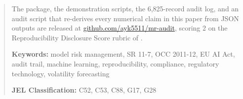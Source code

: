 \documentclass[12pt,a4paper]{article}
\begin{document}
\begin{abstract}
The package, the demonstration scripts, the 6{,}825-record audit log, and an audit script that re-derives every numerical claim in this paper from JSON outputs are released at \href{https://github.com/ayk5511/mr-audit}{github.com/ayk5511/mr-audit}, scoring 2 on the Reproducibility Disclosure Score rubric of \citet{Khan2026Survey}.

\medskip
\noindent\textbf{Keywords:} model risk management, SR 11-7, OCC 2011-12, EU AI Act, audit trail, machine learning, reproducibility, compliance, regulatory technology, volatility forecasting

\medskip
\noindent\textbf{JEL Classification:} C52, C53, C88, G17, G28
\end{abstract}

\newpage
\tableofcontents
\newpage










\end{document}
